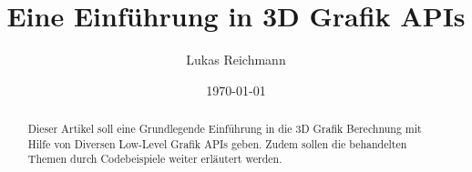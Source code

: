\documentclass[10pt,conference,a4paper]{IEEEtran}
\title{Eine Einführung in 3D Grafik APIs}
\author{Lukas Reichmann}
\date{\today}
\begin{document}
\maketitle

\begin{abstract}
    Dieser Artikel soll eine Grundlegende Einführung in die 3D Grafik Berechnung mit Hilfe von Diversen Low-Level Grafik APIs geben. Zudem sollen die behandelten Themen durch Codebeispiele weiter erläutert werden.
\end{abstract}









\end{document}
